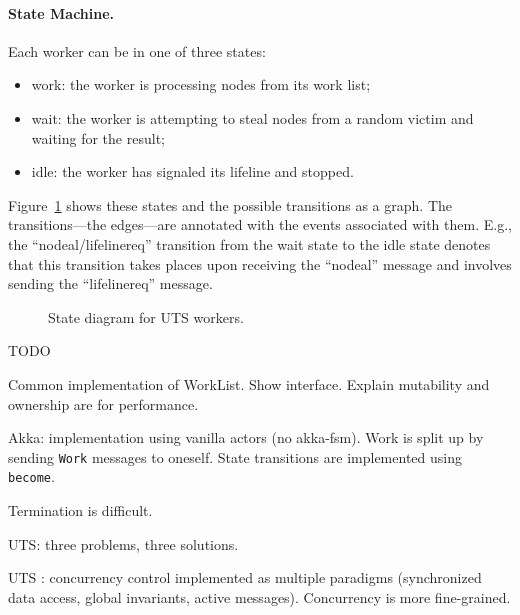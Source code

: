 \paragraph{State Machine.} Each worker can be in one of three states:
\begin{itemize}
\item work: the worker is processing nodes from its work list;
\item wait: the worker is attempting to steal nodes from a random victim and waiting for the result;
\item idle: the worker has signaled its lifeline and stopped.
\end{itemize}
Figure~\ref{fig:uts-state} shows these states and the possible transitions as a graph. The transitions---the edges---are annotated with the events associated with them. E.g., the ``nodeal/lifelinereq'' transition from the wait state to the idle state denotes that this transition takes places upon receiving the ``nodeal'' message and involves sending the ``lifelinereq'' message.

\begin{figure}
\centering
{}
\caption{State diagram for UTS workers.\label{fig:uts-state}}
\end{figure}

TODO

Common implementation of WorkList. Show interface. Explain mutability and
ownership are for performance.

Akka: implementation using vanilla actors (no akka-fsm). Work is split up by
sending \lstinline{Work} messages to oneself. State transitions are implemented
using \lstinline{become}.

Termination is difficult.

UTS: three problems, three solutions.

UTS \apgas: concurrency control implemented as multiple paradigms (synchronized
data access, global invariants, active messages). Concurrency is more
fine-grained.

